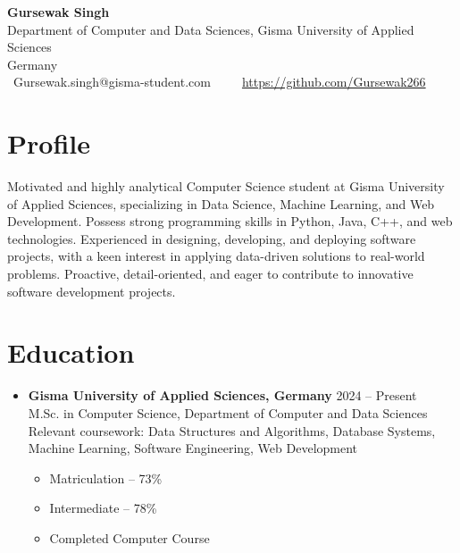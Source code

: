 \documentclass[a4paper,10pt]{article}
\makeatletter
\newcommand{\name}{Gursewak Singh}
\newcommand{\email}{Gursewak.singh@gisma-student.com}
\newcommand{\github}{https://github.com/Gursewak266}
\newcommand{\university}{Gisma University of Applied Sciences}
\newcommand{\department}{Department of Computer and Data Sciences}
\newcommand{\location}{Germany}
\makeatother
\begin{document}
\begin{center}
    {\LARGE \textbf{\name}}\\[1mm]
    \department, \university\\
    \location \\
    \faEnvelope\ \email \quad
    \faPhone\ \phone \quad
    \faLinkedin\ \href{https://\linkedin}{\linkedin} \quad
    \faGithub\ \href{https://\github}{\github}
\end{center}

\vspace{3mm}

\section*{Profile}
Motivated and highly analytical Computer Science student at \university, specializing in Data Science, Machine Learning, and Web Development. Possess strong programming skills in Python, Java, C++, and web technologies. Experienced in designing, developing, and deploying software projects, with a keen interest in applying data-driven solutions to real-world problems. Proactive, detail-oriented, and eager to contribute to innovative software development projects.

\section*{Education}
\begin{itemize}[leftmargin=0.5cm]
    \item \textbf{Gisma University of Applied Sciences, Germany} \hfill 2024 -- Present\\
    M.Sc. in Computer Science, Department of Computer and Data Sciences\\
    Relevant coursework: Data Structures and Algorithms, Database Systems, Machine Learning, Software Engineering, Web Development
    \begin{itemize}[leftmargin=1.5cm]
    \item Matriculation – 73\%
    \item Intermediate – 78\%
    \item Completed Computer Course
\end{itemize}
\end{itemize}
\end{document}

